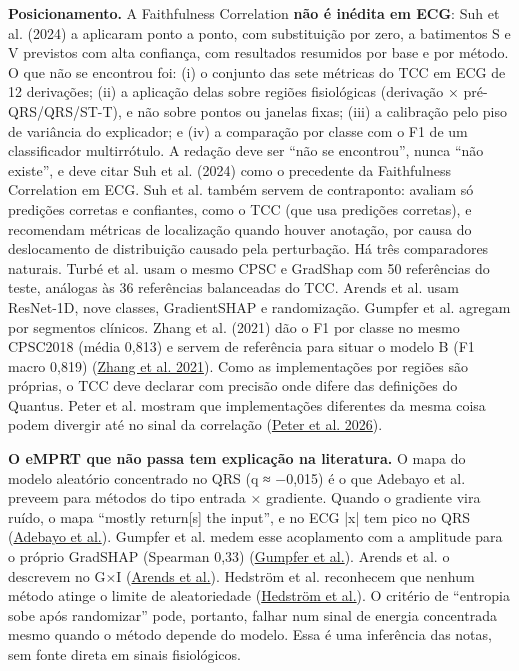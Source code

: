 \documentclass[11pt,a4paper]{article}
\begin{document}
\textbf{Posicionamento.} A Faithfulness Correlation \textbf{não é inédita em ECG}: Suh et al. (2024) a aplicaram ponto a ponto, com substituição por zero, a batimentos S e V previstos com alta confiança, com resultados resumidos por base e por método. O que não se encontrou foi: (i) o conjunto das sete métricas do TCC em ECG de 12 derivações; (ii) a aplicação delas sobre regiões fisiológicas (derivação × pré-QRS/QRS/ST-T), e não sobre pontos ou janelas fixas; (iii) a calibração pelo piso de variância do explicador; e (iv) a comparação por classe com o F1 de um classificador multirrótulo. A redação deve ser ``não se encontrou'', nunca ``não existe'', e deve citar Suh et al. (2024) como o precedente da Faithfulness Correlation em ECG. Suh et al. também servem de contraponto: avaliam só predições corretas e confiantes, como o TCC (que usa predições corretas), e recomendam métricas de localização quando houver anotação, por causa do deslocamento de distribuição causado pela perturbação. Há três comparadores naturais. Turbé et al. usam o mesmo CPSC e GradShap com 50 referências do teste, análogas às 36 referências balanceadas do TCC. Arends et al. usam ResNet-1D, nove classes, GradientSHAP e randomização. Gumpfer et al. agregam por segmentos clínicos. Zhang et al. (2021) dão o F1 por classe no mesmo CPSC2018 (média 0,813) e servem de referência para situar o modelo B (F1 macro 0,819) (\href{https://pmc.ncbi.nlm.nih.gov/articles/PMC8082080}{Zhang et al. 2021}). Como as implementações por regiões são próprias, o TCC deve declarar com precisão onde difere das definições do Quantus. Peter et al. mostram que implementações diferentes da mesma coisa podem divergir até no sinal da correlação (\href{https://arxiv.org/abs/2608.21449}{Peter et al. 2026}).

\textbf{O eMPRT que não passa tem explicação na literatura.} O mapa do modelo aleatório concentrado no QRS (q ≈ −0,015) é o que Adebayo et al. preveem para métodos do tipo entrada × gradiente. Quando o gradiente vira ruído, o mapa ``mostly return[s] the input'', e no ECG |x| tem pico no QRS (\href{https://arxiv.org/abs/1810.03292}{Adebayo et al.}). Gumpfer et al. medem esse acoplamento com a amplitude para o próprio GradSHAP (Spearman 0,33) (\href{https://arxiv.org/abs/2607.24035}{Gumpfer et al.}). Arends et al. o descrevem no G×I (\href{https://pmc.ncbi.nlm.nih.gov/articles/PMC12980500/}{Arends et al.}). Hedström et al. reconhecem que nenhum método atinge o limite de aleatoriedade (\href{https://arxiv.org/abs/2401.06465}{Hedström et al.}). O critério de ``entropia sobe após randomizar'' pode, portanto, falhar num sinal de energia concentrada mesmo quando o método depende do modelo. Essa é uma inferência das notas, sem fonte direta em sinais fisiológicos.
\end{document}
